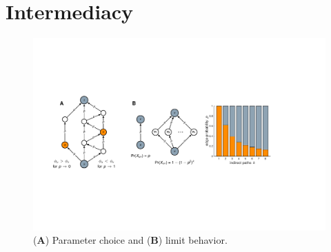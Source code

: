 \documentclass[9pt,twocolumn,twoside,lineno]{pnas-alt}
\theoremstyle{definition}
\begin{document}


%
%

\section*{\label{sec:intermediacy}Intermediacy}

\begin{sansmath}\begin{figure}
    \centering%
    \includegraphics[width=11.4cm]{examples}
    \caption{(\textbf{A}) Parameter choice and (\textbf{B}) limit behavior.}
    \label{fig:examples}
\end{figure}\end{sansmath}
\end{document}
